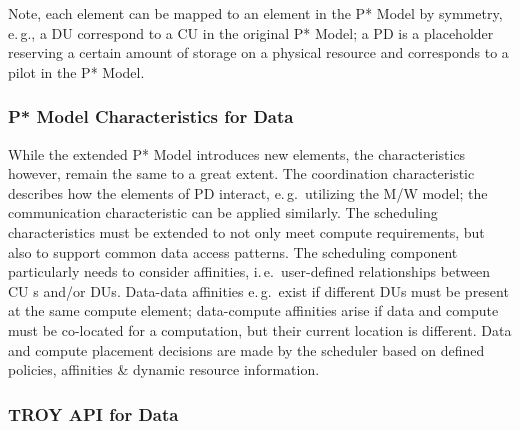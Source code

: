 \documentclass[conference,final]{IEEEtran}
\makeatletter
\def\reduwave{\bgroup \markoverwith{\lower3.5\p@\hbox{\sixly \textcolor{red}{\char58}}}\ULon}
\newcommand{\jwave}[1]{ {\reduwave{#1}}}
\newcommand{\jhanote}[1]{ {\textcolor{red} { ***shantenu: #1 }}}
\newcommand{\alnote}[1]{ {\textcolor{blue} { ***andre: #1 }}}
\newcommand{\jwave}[1]{#1}
\newcommand{\alnote}[1]{}
\newcommand{\jhanote}[1]{}
\newcommand{\cu}{CU\xspace}
\makeatother
\begin{document}
Note, each element can be mapped to an element in the P* Model by
symmetry, e.\,g., a DU correspond to a \cu  in the original P* Model; 
a PD is a placeholder reserving a certain amount of storage on a physical 
resource and corresponds to a pilot in the P* Model.



\subsubsection*{P* Model Characteristics for Data}

While the extended P* Model introduces new elements, the
characteristics however, remain the same to a great extent. The
coordination characteristic describes how the elements of PD interact,
e.\,g.\ utilizing the M/W model; the communication characteristic can
be applied similarly. The scheduling characteristics must be extended
to not only meet compute requirements, but also to support common data
access patterns. The scheduling component particularly needs to
consider affinities, i.\,e.\ user-defined relationships between \cu s
and/or DUs. Data-data affinities e.\,g.\ exist if different DUs must
be present at the same compute element; data-compute affinities arise
if data and compute must be co-located for a computation, but their
current location is different. Data and compute placement decisions are
made by the scheduler based on defined policies, affinities \& dynamic
resource information.

\subsubsection*{TROY API for Data}
\end{document}
